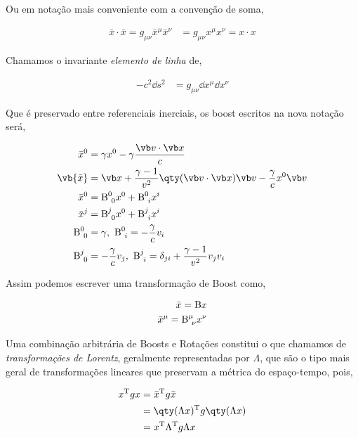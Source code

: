 \documentclass[twoside]{amsart}
\numberwithin{equation}{section}
\begin{document}
Ou em notação mais conveniente com a convenção de soma,

\begin{align}
    \bar x\cdot \bar x=g_{\mu\nu}{\bar x}^\mu {\bar x}^\nu&=g_{\mu\nu}x^\mu x^\nu=x\cdot x
\end{align}

Chamamos o invariante \emph{elemento de linha} de,

\begin{align}
    -c^2\dd{s}^2&=g_{\mu\nu}\dd{x^\mu}\dd{x^\nu}
\end{align}

Que é preservado entre referenciais inerciais, os boost escritos na nova notação será,

\begin{align}
    {\bar x}^0&=\gamma x^0-\gamma\frac{\vb v\cdot\vb x}{c}\\
    \vb {\bar x}&=\vb x+\frac{\gamma-1}{v^2}\qty(\vb v \cdot \vb x)\vb v-\frac{\gamma}{c} x^0\vb v\\
    {\bar x}^0&={\textup B}^0_{\ 0}x^0+{\textup B}^0_{\ i}x^i\\
    {\bar x}^j&={\textup B}^j_{\ 0}x^0+{\textup B}^j_{\ i}x^i\\
    {\textup B}^0_{\ 0}&=\gamma,\ {\textup B}^0_{\ i}=-\frac{\gamma}{c}v_i\\
    {\textup B}^j_{\ 0}&=-\frac{\gamma}{c}v_j,\ {\textup B}^j_{\ i}=\delta_{ji}+\frac{\gamma-1}{v^2}v_jv_i
\end{align}

Assim podemos escrever uma transformação de Boost como,

\begin{align}
    \bar x={\textup B} x\\
    {\bar x}^\mu={\textup B}^\mu_{\ \nu}x^\nu
\end{align}

Uma combinação arbitrária de Boosts e Rotações constitui o que chamamos de \emph{transformações de Lorentz}, geralmente representadas por $\Lambda$, que são o tipo mais geral de transformações lineares que preservam a métrica do espaço-tempo, pois,

\begin{align}
    x^{\textup T}g x&={\bar x}^{\textup T}g{\bar x}\\
    &=\qty(\Lambda x)^{\textup T}g\qty(\Lambda x)\\
    &=x^{\textup T}\Lambda^{\textup T}g\Lambda x
\end{align}
\end{document}
